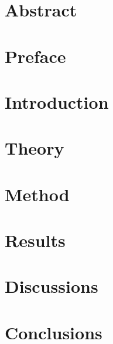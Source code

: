 \documentclass[12pt]{article}
\begin{document}


\section*{Abstract}

\newpage

\section*{Preface}

\newpage

\tableofcontents
\newpage

\section{Introduction} \label{intro}


\section{Theory} \label{theory}


\section{Method} \label{method}


\section{Results} \label{results}


\section{Discussions} \label{discussions}


\newpage
\section{Conclusions} \label{conclusions}


\medskip
\printbibliography
\end{document}
